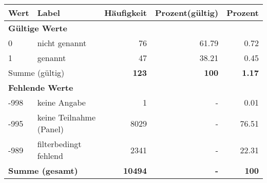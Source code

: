      \begin{longtable}{lXrrr}
     \toprule
     \textbf{Wert} & \textbf{Label} & \textbf{Häufigkeit} & \textbf{Prozent(gültig)} & \textbf{Prozent} \\
     \endhead
     \midrule
     \multicolumn{5}{l}{\textbf{Gültige Werte}}\\

     0 &
     \multicolumn{1}{X}{ nicht genannt   } &


       \num{76} &
       \num[round-mode=places,round-precision=2]{61,79} &
         \num[round-mode=places,round-precision=2]{0,72} \\

     1 &
     \multicolumn{1}{X}{ genannt   } &


       \num{47} &
       \num[round-mode=places,round-precision=2]{38,21} &
         \num[round-mode=places,round-precision=2]{0,45} \\
     \midrule
     \multicolumn{2}{l}{Summe (gültig)} &
       \textbf{\num{123}} &
     \textbf{100} &
       \textbf{\num[round-mode=places,round-precision=2]{1,17}} \\
     \multicolumn{5}{l}{\textbf{Fehlende Werte}}\\
       -998 &
       keine Angabe &
         \num{1} &
        - &
         \num[round-mode=places,round-precision=2]{0,01} \\
       -995 &
       keine Teilnahme (Panel) &
         \num{8029} &
        - &
         \num[round-mode=places,round-precision=2]{76,51} \\
       -989 &
       filterbedingt fehlend &
         \num{2341} &
        - &
         \num[round-mode=places,round-precision=2]{22,31} \\
     \midrule
     \multicolumn{2}{l}{\textbf{Summe (gesamt)}} &
          \textbf{\num{10494}} &
        \textbf{-} &
        \textbf{100} \\
     \bottomrule
     \end{longtable}
     
